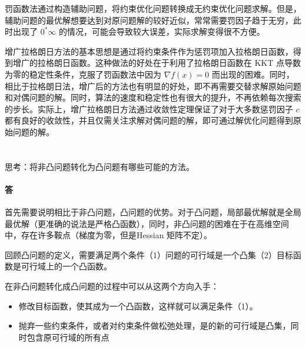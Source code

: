 \documentclass[a4paper]{article}
\begin{document}
罚函数法通过构造辅助问题，将约束优化问题转换成无约束优化问题求解。但是，辅助问题的最优解想要达到对原问题解的较好近似，常常需要罚因子趋于无穷，此时出现了 $0^* \infty$ 的情况，可能会导致较大误差，实际求解变得很不方便。

增广拉格朗日方法的基本思想是通过将约束条件作为惩罚项加入拉格朗日函数，得到增广的拉格朗日函数。这种做法的好处在于利用了拉格朗日函数在 KKT 点导数为零的稳定性条件，克服了罚函数法中因为 $\nabla f(x) = 0$ 而出现的困难。同时，相比于拉格朗日法，增广后的方法也有明显的好处，即不再需要交替求解原始问题和对偶问题的解。同时，算法的速度和稳定性也有很大的提升，不再依赖每次搜索的步长。实际上，增广拉格朗日方法通过收敛性定理保证了对于大多数惩罚因子 $c$ 都有良好的收敛性，并且仅需关注求解对偶问题的解，即可通过解优化问题得到原始问题的解。

\section{}
思考：将非凸问题转化为凸问题有哪些可能的方法。 

\paragraph{答}

首先需要说明相比于非凸问题，凸问题的优势。对于凸问题，局部最优解就是全局最优解（更准确的说法是严格凸函数），同时，非凸问题的困难在于在高维空间中，存在许多鞍点（梯度为零，但是Hessian 矩阵不定）。

回顾凸问题的定义，需要满足两个条件（1）问题的可行域是一个凸集（2）目标函数是可行域上的一个凸函数。

在非凸问题转化成凸问题的过程中可以从这两个方向入手：
\begin{itemize}
   \item 修改目标函数，使其成为一个凸函数，这样就可以满足条件（1）。
   \item 抛弃一些约束条件，或者对约束条件做松弛处理，是的新的可行域是凸集，同时包含原可行域的所有点
\end{itemize}
\end{document}
